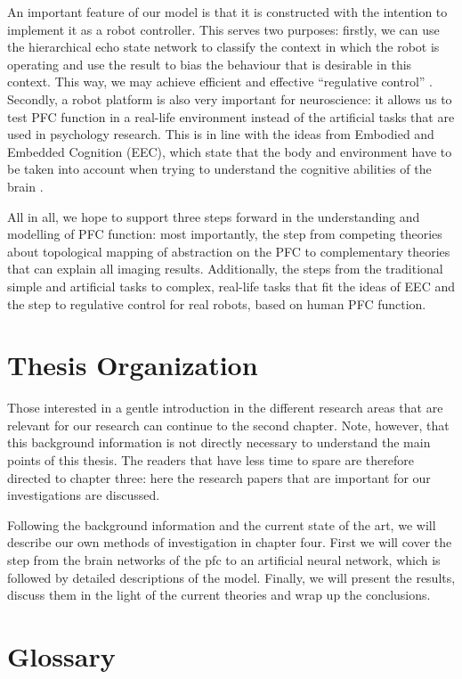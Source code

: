 \documentclass[10pt,a4paper]{report}
\begin{document}
An important feature of our model is that it is constructed with the intention to implement it as a robot controller. This serves two purposes: firstly, we can use the hierarchical echo state network to classify the context in which the robot is operating and use the result to bias the behaviour that is desirable in this context. This way, we may achieve efficient and effective ``regulative control'' \citep{Lagarde2010}. Secondly, a robot platform is also very important for neuroscience: it allows us to test PFC function in a real-life environment instead of the artificial tasks that are used in psychology research. This is in line with the ideas from Embodied and Embedded Cognition (EEC), which state that the body and environment have to be taken into account when trying to understand the cognitive abilities of the brain \citep{Haselager2008}.

All in all, we hope to support three steps forward in the understanding and modelling of PFC function: most importantly, the step from competing theories about topological mapping of abstraction on the PFC to complementary theories that can explain all imaging results. Additionally, the steps from the traditional simple and artificial tasks to complex, real-life tasks that fit the ideas of EEC and the step to regulative control for real robots, based on human PFC function.

\section{Thesis Organization}
Those interested in a gentle introduction in the different research areas that are relevant for our research can continue to the second chapter. Note, however, that this background information is not directly necessary to understand the main points of this thesis. The readers that have less time to spare are therefore directed to chapter three: here the research papers that are important for our investigations are discussed. 

Following the background information and the current state of the art, we will describe our own methods of investigation in chapter four. First we will cover the step from the brain networks of the \gls{pfc} to an artificial neural network, which is followed by detailed descriptions of the model. Finally, we will present the results, discuss them in the light of the current theories and wrap up the conclusions.

\section{Glossary}
\end{document}
